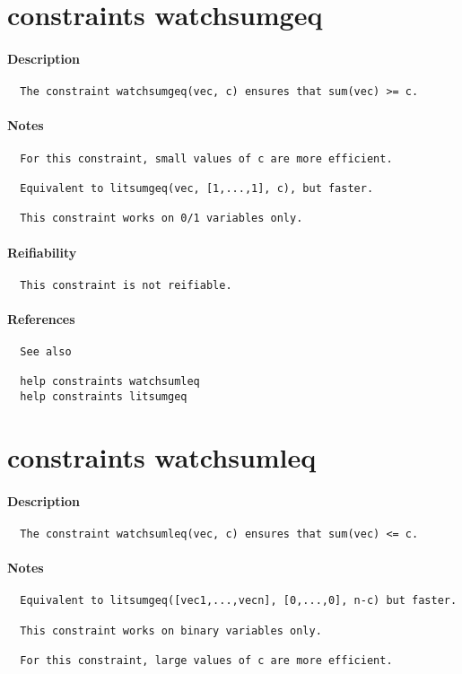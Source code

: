 \section{constraints watchsumgeq}
\paragraph{Description}
{\footnotesize
\begin{verbatim}
  The constraint watchsumgeq(vec, c) ensures that sum(vec) >= c.
\end{verbatim}
}
\paragraph{Notes}
{\footnotesize
\begin{verbatim}
  For this constraint, small values of c are more efficient.

  Equivalent to litsumgeq(vec, [1,...,1], c), but faster.

  This constraint works on 0/1 variables only.
\end{verbatim}
}
\paragraph{Reifiability}
{\footnotesize
\begin{verbatim}
  This constraint is not reifiable.
\end{verbatim}
}
\paragraph{References}
{\footnotesize
\begin{verbatim}
  See also

  help constraints watchsumleq
  help constraints litsumgeq
\end{verbatim}
}
\section{constraints watchsumleq}
\paragraph{Description}
{\footnotesize
\begin{verbatim}
  The constraint watchsumleq(vec, c) ensures that sum(vec) <= c.
\end{verbatim}
}
\paragraph{Notes}
{\footnotesize
\begin{verbatim}
  Equivalent to litsumgeq([vec1,...,vecn], [0,...,0], n-c) but faster.

  This constraint works on binary variables only.

  For this constraint, large values of c are more efficient.
\end{verbatim}
}
